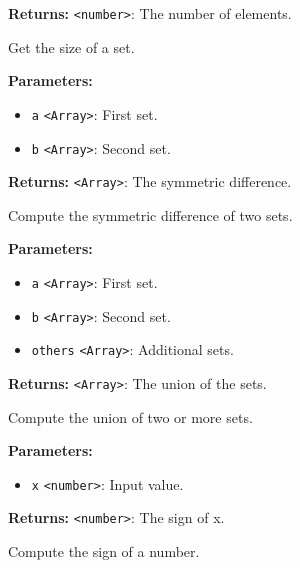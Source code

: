 \documentclass[12pt,a4paper]{article}
\begin{document}
\noindent \textbf{Returns:} \texttt{<number>}: The number of elements.

\noindent Get the size of a set.

\vspace{5mm}
\noindent {}


\noindent \textbf{Parameters:}
\begin{itemize}
  \item \texttt{a} \texttt{<Array>}: First set.
  \item \texttt{b} \texttt{<Array>}: Second set.
\end{itemize}

\noindent \textbf{Returns:} \texttt{<Array>}: The symmetric difference.

\noindent Compute the symmetric difference of two sets.

\vspace{5mm}
\noindent {}


\noindent \textbf{Parameters:}
\begin{itemize}
  \item \texttt{a} \texttt{<Array>}: First set.
  \item \texttt{b} \texttt{<Array>}: Second set.
  \item \texttt{others} \texttt{<Array>}: Additional sets.
\end{itemize}

\noindent \textbf{Returns:} \texttt{<Array>}: The union of the sets.

\noindent Compute the union of two or more sets.

\vspace{5mm}
\noindent {}


\noindent \textbf{Parameters:}
\begin{itemize}
  \item \texttt{x} \texttt{<number>}: Input value.
\end{itemize}

\noindent \textbf{Returns:} \texttt{<number>}: The sign of x.

\noindent Compute the sign of a number.
\end{document}

